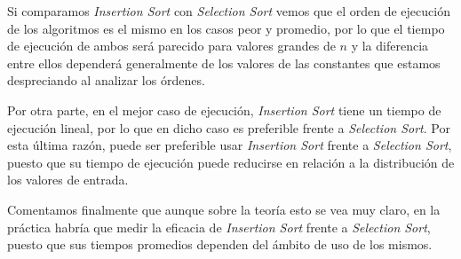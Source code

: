 \noindent
Si comparamos \textit{Insertion Sort} con \textit{Selection Sort} vemos que el orden de ejecución de los algoritmos es el mismo en los casos peor y promedio, por lo que el tiempo de ejecución de ambos será parecido para valores grandes de $n$ y la diferencia entre ellos dependerá generalmente de los valores de las constantes que estamos despreciando al analizar los órdenes.

Por otra parte, en el mejor caso de ejecución, \textit{Insertion Sort} tiene un tiempo de ejecución lineal, por lo que en dicho caso es preferible frente a \textit{Selection Sort}. Por esta última razón, puede ser preferible usar \textit{Insertion Sort} frente a \textit{Selection Sort}, puesto que su tiempo de ejecución puede reducirse en relación a la distribución de los valores de entrada. 

Comentamos finalmente que aunque sobre la teoría esto se vea muy claro, en la práctica habría que medir la eficacia de \textit{Insertion Sort} frente a \textit{Selection Sort}, puesto que sus tiempos promedios dependen del ámbito de uso de los mismos.

